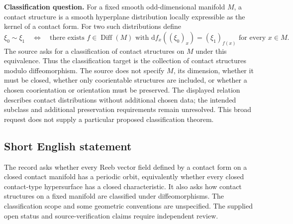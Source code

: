 \documentclass[11pt]{article}
\begin{document}
\textbf{Classification question.} For a fixed smooth odd-dimensional manifold \(M\), a contact structure is a smooth hyperplane distribution locally expressible as the kernel of a contact form. For two such distributions define
\[
\xi_0\sim\xi_1
\quad\Longleftrightarrow\quad
\text{there exists }f\in\operatorname{Diff}(M)
\text{ with }\mathrm d f_x((\xi_0)_x)=(\xi_1)_{f(x)}
\text{ for every }x\in M.
\]
The source asks for a classification of contact structures on \(M\) under this equivalence. Thus the classification target is the collection of contact structures modulo diffeomorphism. The source does not specify \(M\), its dimension, whether it must be closed, whether only coorientable structures are included, or whether a chosen coorientation or orientation must be preserved. The displayed relation describes contact distributions without additional chosen data; the intended subclass and additional preservation requirements remain unresolved. This broad request does not supply a particular proposed classification theorem.
\subsection{Short English statement}
The record asks whether every Reeb vector field defined by a contact form on a closed contact manifold has a periodic orbit, equivalently whether every closed contact-type hypersurface has a closed characteristic. It also asks how contact structures on a fixed manifold are classified under diffeomorphisms. The classification scope and some geometric conventions are unspecified. The supplied open status and source-verification claims require independent review.
\end{document}
